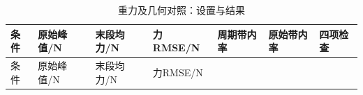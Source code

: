 \FloatBarrier\begingroup\small\setlength{\tabcolsep}{2.5pt}
\begin{longtable}[]{@{}
  >{\raggedright\arraybackslash}p{}
  >{\raggedright\arraybackslash}p{}
  >{\raggedright\arraybackslash}p{}
  >{\raggedright\arraybackslash}p{}
  >{\raggedright\arraybackslash}p{}
  >{\raggedright\arraybackslash}p{}
  >{\raggedright\arraybackslash}p{}@{}}
\caption{重力及几何对照：设置与结果}\label{tab:s13-2}\tabularnewline
\toprule\noalign{}
\begin{minipage}[b]{\linewidth}\raggedright
条件
\end{minipage} & \begin{minipage}[b]{\linewidth}\raggedright
原始峰值/N
\end{minipage} & \begin{minipage}[b]{\linewidth}\raggedright
末段均力/N
\end{minipage} & \begin{minipage}[b]{\linewidth}\raggedright
力RMSE/N
\end{minipage} & \begin{minipage}[b]{\linewidth}\raggedright
周期带内率
\end{minipage} & \begin{minipage}[b]{\linewidth}\raggedright
原始带内率
\end{minipage} & \begin{minipage}[b]{\linewidth}\raggedright
四项检查
\end{minipage} \\
\midrule\noalign{}
\endfirsthead
\toprule\noalign{}
\begin{minipage}[b]{\linewidth}\raggedright
条件
\end{minipage} & \begin{minipage}[b]{\linewidth}\raggedright
原始峰值/N
\end{minipage} & \begin{minipage}[b]{\linewidth}\raggedright
末段均力/N
\end{minipage} & \begin{minipage}[b]{\linewidth}\raggedright
力RMSE/N
\end{minipage} & \begin{minipage}[b]{\linewidth}\raggedright

\end{minipage}
\end{longtable}
